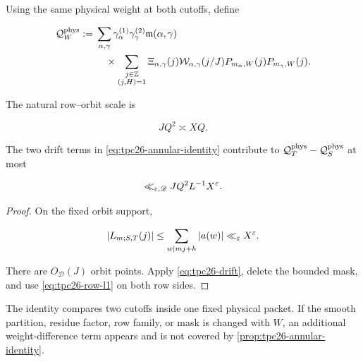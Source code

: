 Using the same physical weight at both cutoffs, define

\begin{align}
 \mathcal Q_W^{\rm phys}
 :={}&
 \sum_{\alpha,\gamma}
 \gamma_\alpha^{(1)}\gamma_\gamma^{(2)}
 \mathfrak m(\alpha,\gamma)
 \notag\\
 &\quad\times
 \sum_{\substack{j\in\mathbb Z\\(j,H)=1}}
 \Xi_{\alpha,\gamma}(j)
 \mathcal W_{\alpha,\gamma}(j/J)
 P_{m_\alpha,W}(j)P_{m_\gamma,W}(j).
 \label{eq:tpc26-physical-QW}
\end{align}

The natural row--orbit scale is

\begin{equation}
 JQ^2\asymp XQ.
 \label{eq:tpc26-natural-scale}
\end{equation}

\begin{lemma}
\label{lem:tpc26-drift-bound}
The two drift terms in \eqref{eq:tpc26-annular-identity} contribute to
\(\mathcal Q_T^{\rm phys}-\mathcal Q_S^{\rm phys}\) at most

\begin{equation}
 \ll_{\varepsilon,\mathscr D}JQ^2L^{-1}X^\varepsilon.
 \label{eq:tpc26-drift-bound}
\end{equation}
\end{lemma}

\begin{proof}
On the fixed orbit support,

\[
 |L_{m;S,T}(j)|
 \le\sum_{w\mid mj+h}|a(w)|\ll_\varepsilon X^\varepsilon.
\]

There are \(O_{\mathscr D}(J)\) orbit points.  Apply
\eqref{eq:tpc26-drift}, delete the bounded mask, and use
\eqref{eq:tpc26-row-l1} on both row sides.
\end{proof}

\begin{remark}
\label{rem:tpc26-fixed-weight}
The identity compares two cutoffs inside one fixed physical packet.
If the smooth partition, residue factor, row family, or mask is changed
with \(W\), an additional weight-difference term appears and is not
covered by \cref{prop:tpc26-annular-identity}.
\end{remark}
